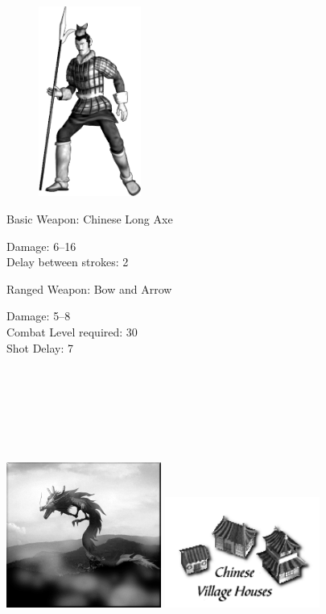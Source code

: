 \begin{figure}
	\begin{center}
		\vspace{-20pt}
		\includegraphics[width=0.3\textwidth]{Achinese}
	\end{center}
	\vspace{-20pt}
\end{figure}

Basic Weapon: Chinese Long Axe
\begin{adjustwidth}{1cm}{}
	Damage: 6–16 \\
	Delay between strokes: 2
\end{adjustwidth}
Ranged Weapon: Bow and Arrow
\begin{adjustwidth}{1cm}{}
	Damage: 5–8 \\
	Combat Level required: 30 \\
	Shot Delay: 7 \\ \\ \\ \\ \\ \\ \\
\end{adjustwidth}

\begin{center}
\includegraphics[width=2in]{Ajingnung} \hspace{1pt} \includegraphics[width=2in]{Ichinesehouse}
\end{center}

